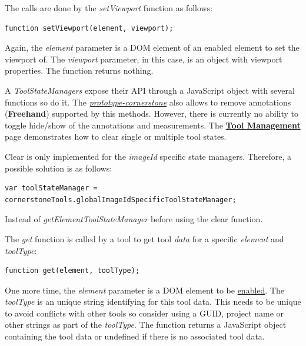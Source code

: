 \documentclass{tufte-book} %
\begin{document}
\hfill

The calls are done by the \textit{setViewport} function as follows:

\hfill

\begin{lstlisting}
function setViewport(element, viewport);
\end{lstlisting}

\hfill

Again, the \textit{element} parameter is a DOM element of an enabled element to set the viewport of. The \textit{viewport} parameter, in this case, is an object with viewport properties. The function returns nothing.

\hfill

A \textit{ToolStateManagers} expose their API through a JavaScript object with several functions so do it. The \href{https://github.com/MIMBCD-UI/prototype-cornerstone}{\textit{prototype-cornerstone}} also allows to remove annotations (\textbf{Freehand}) supported by this methods. However, there is currently no ability to toggle hide/show of the annotations and measurements. The \href{https://rawgit.com/chafey/cornerstoneTools/master/examples/clearToolData/index.html#}{\textbf{Tool Management}} page demonstrates how to clear single or multiple tool states.

\hfill

Clear is only implemented for the \textit{imageId} specific state managers. Therefore, a possible solution is as follows:

\hfill

\begin{lstlisting}
var toolStateManager = cornerstoneTools.globalImageIdSpecificToolStateManager;
\end{lstlisting}

\hfill

Instead of \textit{getElementToolStateManager} before using the clear function.

\hfill

The \textit{get} function is called by a tool to get tool \textit{data} for a specific \textit{element} and \textit{toolType}:

\begin{lstlisting}
function get(element, toolType);
\end{lstlisting}

\hfill

One more time, the \textit{element} parameter is a DOM element to be \href{https://github.com/cornerstonejs/cornerstone/wiki/enabled-element}{enabled}. The \textit{toolType} is an unique string identifying for this tool data. This needs to be unique to avoid conflicts with other tools so consider using a GUID, project name or other strings as part of the \textit{toolType}. The function returns a JavaScript object containing the tool data or undefined if there is no associated tool data.
\end{document}
